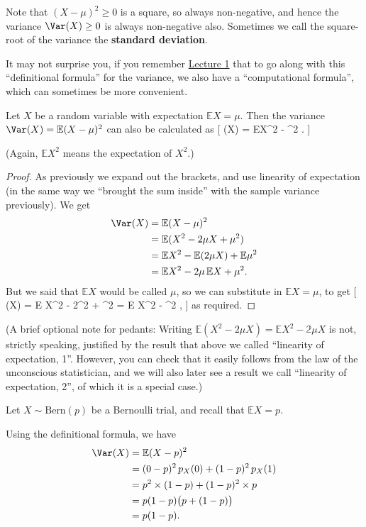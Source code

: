 \documentclass[
  letterpaper,
  DIV=11,
  numbers=noendperiod]{scrreprt}
\theoremstyle{remark}
\begin{document}
Note that \((X - \mu)^2 \geq 0\) is a square, so always non-negative,
and hence the variance \(\Var(X) \geq 0\) is always non-negative also.
Sometimes we call the square-root of the variance the \textbf{standard
deviation}.

It may not surprise you, if you remember
\protect\hyperlink{L01-stats}{Lecture 1} that to go along with this
``definitional formula'' for the variance, we also have a
``computational formula'', which can sometimes be more convenient.

Let \(X\) be a random variable with expectation \(\mathbb EX = \mu\).
Then the variance \(\Var(X) = \mathbb E(X - \mu)^2\) can also be
calculated as {[} \Var(X) = \mathbb EX\^{}2 - \mu\^{}2 . {]}

(Again, \(\mathbb EX^2\) means the expectation of \(X^2\).)

\begin{proof}

As previously we expand out the brackets, and use linearity of
expectation (in the same way we ``brought the sum inside'' with the
sample variance previously). We get \begin{align*}
  \Var(X) &= \mathbb E(X - \mu)^2 \\
    &= \mathbb E(X^2 - 2\mu X + \mu^2) \\
    &= \mathbb EX^2 - \mathbb E(2\mu X) + \mathbb E \mu^2 \\
    &= \mathbb EX^2 - 2\mu \,\mathbb EX + \mu^2 .
\end{align*} But we said that \(\mathbb EX\) would be called \(\mu\), so
we can substitute in \(\mathbb EX = \mu\), to get {[} \Var(X) =
\mathbb E X\^{}2 - 2\mu\^{}2 + \mu\^{}2 = \mathbb E X\^{}2 - \mu\^{}2 ,
{]} as required.

\end{proof}

(A brief optional note for pedants: Writing
\(\mathbb E(X^2 - 2\mu X) = \mathbb EX^2 - \mathbb 2\mu X\) is not,
strictly speaking, justified by the result that above we called
``linearity of expectation, 1''. However, you can check that it easily
follows from the law of the unconscious statistician, and we will also
later see a result we call ``linearity of expectation, 2'', of which it
is a special case.)

Let \(X \sim \text{Bern}(p)\) be a Bernoulli trial, and recall that
\(\mathbb EX = p\).

Using the definitional formula, we have \begin{align*}
\Var(X) &= \mathbb E(X-p)^2 \\
        &= (0 - p)^2 \,p_X(0) + (1-p)^2\, p_X(1) \\
        &= p^2\times(1-p) + (1-p)^2 \times p \\
        &= p(1-p)\big(p + (1-p)\big) \\
        &= p(1-p) .
\end{align*}
\end{document}
